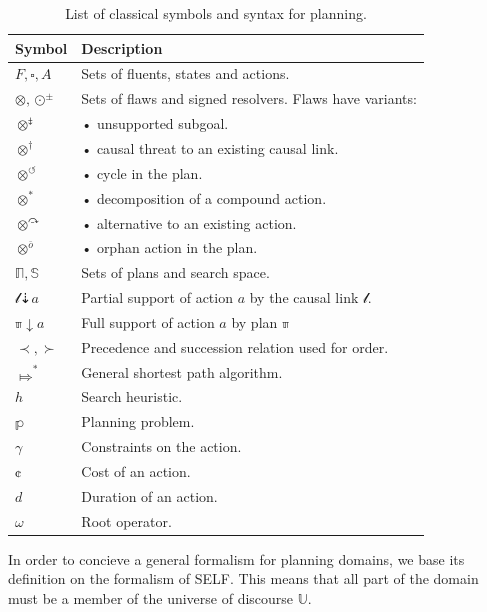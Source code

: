 \documentclass[11pt,a4paper,twoside,openright,titlepage,numbers=noenddot,headinclude,cleardoublepage=empty,openany]{scrreprt}
\theoremstyle{plain}
\theoremstyle{definition}
\theoremstyle{remark}
\newcommand{\bb}{\mathbb}
\renewcommand{\cal}{\mathcal}
\begin{document}
\hypertarget{tbl:planning}{}
\begin{table}\footnotesize
\centering

\caption{\label{tbl:planning}List of classical symbols and syntax for
planning.}

\begin{tabular}{@{}ll@{}}
\toprule

\textbf{Symbol} & \textbf{Description} \\\midrule

\(F, \square, A\) & Sets of fluents, states and actions. \\
\(\otimes, \odot^\pm\) & Sets of flaws and signed resolvers. Flaws have
variants: \\
\(\otimes^\downarrowbarred\) & • unsupported subgoal. \\
\(\otimes^\dagger\) & • causal threat to an existing causal link. \\
\(\otimes^\circlearrowleft\) & • cycle in the plan. \\
\(\otimes^\ast\) & • decomposition of a compound action. \\
\(\otimes^\curvearrowrightminus\) & • alternative to an existing
action. \\
\(\otimes^{\bar{o}}\) & • orphan action in the plan. \\
\(\bb{\Pi}, \bb{S}\) & Sets of plans and search space. \\
\(\cal{l} \downdasharrow a\) & Partial support of action \(a\) by the
causal link \(\cal{l}\). \\
\(\bb{\pi} \downarrow a\) & Full support of action \(a\) by plan
\(\bb{\pi}\) \\
\(\prec, \succ\) & Precedence and succession relation used for order. \\
\(\Mapsto^*\) & General shortest path algorithm. \\
\(h\) & Search heuristic. \\
\(\bb{p}\) & Planning problem. \\
\(\gamma\) & Constraints on the action. \\
\(¢\) & Cost of an action. \\
\(d\) & Duration of an action. \\
\(\omega\) & Root operator. \\

\bottomrule
\end{tabular}

\end{table}

In order to concieve a general formalism for planning domains, we base
its definition on the formalism of SELF. This means that all part of the
domain must be a member of the universe of discourse \(\bb{U}\).
\end{document}

